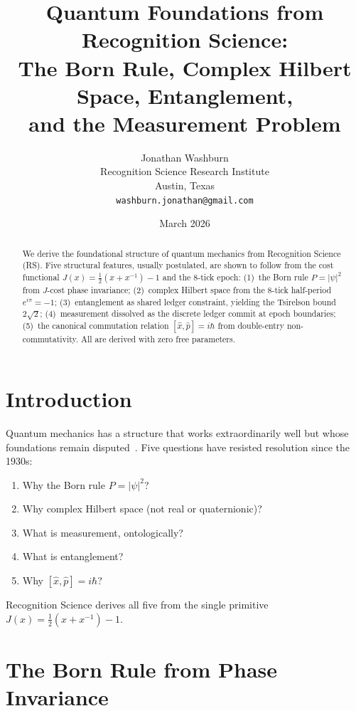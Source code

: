 \documentclass[12pt,a4paper]{article}
\title{Quantum Foundations from Recognition Science:\\
The Born Rule, Complex Hilbert Space, Entanglement,\\
and the Measurement Problem}
\author{Jonathan Washburn\\
Recognition Science Research Institute\\
Austin, Texas\\
\texttt{washburn.jonathan@gmail.com}}
\date{March 2026}
\theoremstyle{definition}
\theoremstyle{remark}
\begin{document}
\maketitle

\begin{abstract}
We derive the foundational structure of quantum mechanics from
Recognition Science (RS).  Five structural features, usually
postulated, are shown to follow from the cost functional
$J(x) = \tfrac{1}{2}(x + x^{-1}) - 1$ and the 8-tick epoch:
(1)~the Born rule $P = |\psi|^2$ from $J$-cost phase invariance;
(2)~complex Hilbert space from the 8-tick half-period
$e^{i\pi} = -1$; (3)~entanglement as shared ledger constraint,
yielding the Tsirelson bound $2\sqrt{2}$;
(4)~measurement dissolved as the discrete ledger commit at epoch
boundaries; (5)~the canonical commutation relation
$[\hat{x}, \hat{p}] = i\hbar$ from double-entry non-commutativity.
All are derived with zero free parameters.
\end{abstract}

\section{Introduction}
\label{sec:intro}

Quantum mechanics has a structure that works extraordinarily well
but whose foundations remain disputed~\cite{Bell1987}.  Five
questions have resisted resolution since the 1930s:
\begin{enumerate}[nosep]
  \item Why the Born rule $P = |\psi|^2$?
  \item Why complex Hilbert space (not real or quaternionic)?
  \item What is measurement, ontologically?
  \item What is entanglement?
  \item Why $[\hat{x}, \hat{p}] = i\hbar$?
\end{enumerate}

Recognition Science derives all five from the single primitive
$J(x) = \tfrac{1}{2}(x + x^{-1}) - 1$.

\section{The Born Rule from Phase Invariance}
\label{sec:born}
\end{document}
